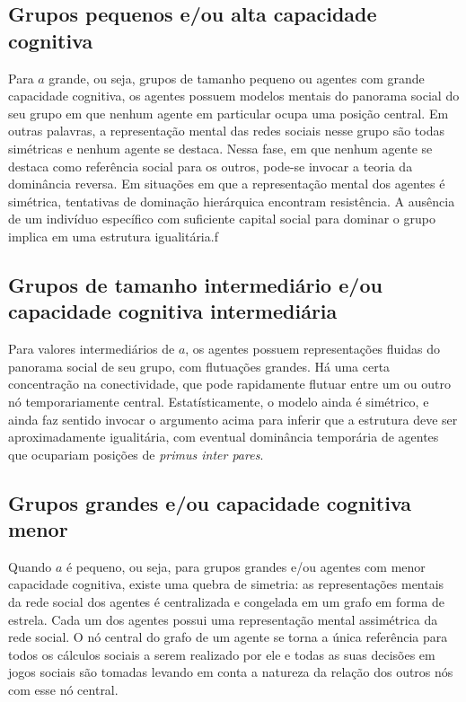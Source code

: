 \subsection{Grupos pequenos e/ou alta capacidade cognitiva}
Para $a$ grande, ou seja, grupos de tamanho pequeno ou agentes com grande capacidade cognitiva, os agentes possuem modelos mentais do panorama social do seu grupo em que nenhum agente em particular ocupa uma posição central. Em outras palavras, a representação mental das redes sociais nesse grupo são todas simétricas e nenhum agente se destaca. Nessa fase, em que nenhum agente se destaca como referência social para os outros, pode-se invocar a teoria da dominância reversa\cite{Boehm2001}. Em situações em que a representação mental dos agentes é simétrica, tentativas de dominação hierárquica encontram resistência. A ausência de um indivíduo específico com suficiente capital social para dominar o grupo implica em uma estrutura igualitária.f

\subsection{Grupos de tamanho intermediário e/ou capacidade cognitiva intermediária}
Para valores intermediários de $a$, os agentes possuem representações fluidas do panorama social de seu grupo, com flutuações grandes. Há uma certa concentração na conectividade, que pode rapidamente flutuar entre um ou outro nó temporariamente central. Estatísticamente, o modelo ainda é simétrico, e ainda faz sentido invocar o argumento acima para inferir que a estrutura deve ser aproximadamente igualitária, com eventual dominância temporária de agentes que ocupariam posições de \textit{primus inter pares}. 
 
\subsection{Grupos grandes e/ou capacidade cognitiva menor}
Quando $a$ é pequeno, ou seja, para grupos grandes e/ou agentes com menor capacidade cognitiva, existe uma quebra de simetria: as representações mentais da rede social dos agentes é centralizada e congelada em um grafo em forma de estrela. Cada um dos agentes possui uma representação mental assimétrica da rede social. O nó central do grafo de um agente se torna a única referência para todos os cálculos sociais a serem realizado por ele e todas as suas decisões em jogos sociais são tomadas levando em conta a natureza da relação dos outros nós com esse nó central. 
 
